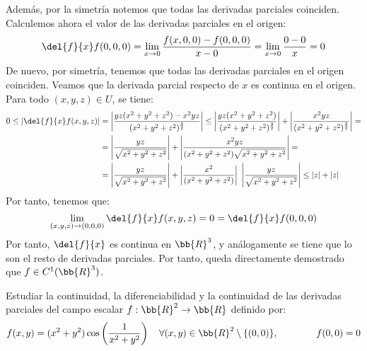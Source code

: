 \begin{ejercicio}
    Además, por la simetría notemos que todas las derivadas parciales coinciden. Calculemos ahora el valor de las derivadas parciales en el origen:
    \begin{equation*}
        \del{f}{x}f(0,0,0) = \lim_{x\to 0} \frac{f(x,0,0) - f(0,0,0)}{x-0} = \lim_{x\to 0} \frac{0-0}{x} = 0
    \end{equation*}
    De nuevo, por simetría, tenemos que todas las derivadas parciales en el origen coinciden. Veamos que la derivada parcial respecto de $x$ es continua en el origen. Para todo $(x,y,z)\in U$, se tiene:
    \begin{equation*}\begin{split}
        0\leq \left|\del{f}{x}f(x,y,z)\right| &= \left|\frac{yz(x^2+y^2+z^2) - x^2yz}{(x^2+y^2+z^2)^{\frac{3}{2}}}\right| \leq \left|\frac{yz(x^2+y^2+z^2)}{(x^2+y^2+z^2)^{\frac{3}{2}}}\right|+\left|\frac{x^2yz}{(x^2+y^2+z^2)^{\frac{3}{2}}}\right| =\\&
        = \left|\frac{yz}{\sqrt{x^2+y^2+z^2}}\right|+\left|\frac{x^2yz}{(x^2+y^2+z^2)\sqrt{x^2+y^2+z^2}}\right| =\\&
        = \left|\frac{yz}{\sqrt{x^2+y^2+z^2}}\right|+\left|\frac{x^2}{(x^2+y^2+z^2)}\right|~\left|\frac{yz}{\sqrt{x^2+y^2+z^2}}\right| \leq |z| + |z|
    \end{split}\end{equation*}
    Por tanto, tenemos que:
    \begin{equation*}
        \lim_{(x,y,z)\to (0,0,0)} \del{f}{x}f(x,y,z) = 0 = \del{f}{x}f(0,0,0)
    \end{equation*}
    Por tanto, $\del{f}{x}$ es continua en $\bb{R}^3$, y análogamente se tiene que lo son el resto de derivadas parciales. Por tanto, queda directamente demostrado que $f\in C^1(\bb{R}^3)$.
\end{ejercicio}

\begin{ejercicio}
    Estudiar la continuidad, la diferenciabilidad y la continuidad de las derivadas parciales del campo escalar $f: \bb{R}^2 \to \bb{R}$ definido por:
    \begin{equation*}
        f(x,y)=(x^2+y^2)\cos\left(\frac{1}{x^2+y^2}\right) \quad \forall (x,y)\in \bb{R}^2\setminus \{(0,0)\},\qquad\qquad f(0,0)=0
    \end{equation*}
\end{ejercicio}